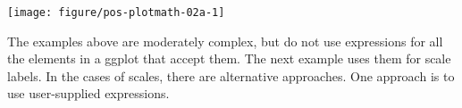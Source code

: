 \documentclass[krantz2]{krantz}\usepackage{knitr}%
\begin{document}
\begin{knitrout}\footnotesize
{}\color{fgcolor}\begin{kframe}
\begin{alltt}
 \hlkwb{<-} 
    \hlopt{+}
   \hlstd{()} \hlopt{+}
   \hlstd{(} \hlstd{=} \hlstd{,}  \hlstd{=} \hlstd{,}  \hlstd{=} \hlstd{)} \hlopt{+}
   \hlstd{(} \hlstd{=} 
         \hlstd{=} \hlopt{~~}\hlopt{~}\hlopt{^}\hlstd{\{}\hlopt{-}\hlstd{\})),}
         \hlstd{=} \hlstd{(} 
        \hlstd{)} \hlopt{+}
   \hlstd{(}\hlstd{,}  
            \hlstd{=} \hlstd{,}  \hlstd{=} \hlstd{,}  \hlstd{=} \hlstd{,}  \hlstd{=} \hlstd{,}  \hlstd{=} \hlstd{)} \hlopt{+}
   \hlstd{(} \hlstd{=} \hlstd{(}\hlopt{-}\hlstd{,} \hlstd{))}
\end{alltt}
\end{kframe}

{\centering \texttt{[image: figure/pos-plotmath-02a-1]} 

}



\end{knitrout}

The examples above are moderately complex, but do not use expressions for all the elements in a ggplot that accept them. The next example uses them for scale labels. In the cases of scales, there are alternative approaches. One approach is to use user-supplied expressions.
\end{document}

